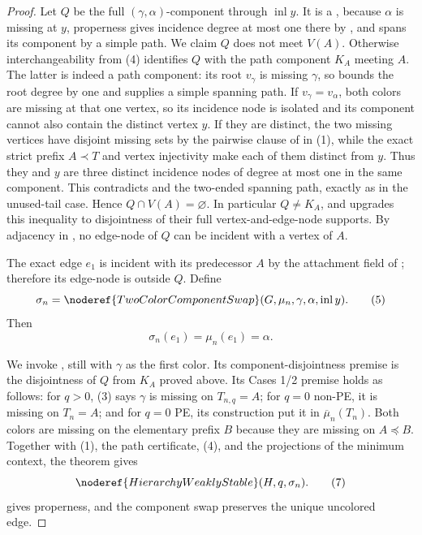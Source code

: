 \begin{proof}
Let \(Q\) be the full \((\gamma,\alpha)\)-component through
\(\operatorname{inl}y\).  It is a
, because \(\alpha\) is missing at \(y\),
properness gives incidence degree at most one there by
, and
 spans its component by a simple
path.  We claim \(Q\) does not meet \(V(A)\).  Otherwise interchangeability
from (4) identifies \(Q\) with the path component \(K_A\) meeting \(A\).
The latter is indeed a path component: its root \(v_\gamma\) is missing
\(\gamma\), so  bounds the root
degree by one and  supplies a
simple spanning path.
If \(v_\gamma=v_\alpha\), both colors are missing at that one vertex, so
its incidence node is isolated and its component cannot also contain the
distinct vertex \(y\).  If they are distinct, the two missing vertices
have disjoint missing sets by the pairwise clause of
 in (1), while the exact strict prefix
\(A\prec T\) and vertex injectivity make each of them distinct from
\(y\).  Thus they and \(y\) are three distinct incidence nodes of degree
at most one in the same component.  This contradicts
 and the two-ended spanning
path, exactly as in the unused-tail case.  Hence \(Q\cap V(A)=\varnothing\).
In particular \(Q\ne K_A\), and
 upgrades this inequality to
disjointness of their full vertex-and-edge-node supports.
By adjacency in , no edge-node of \(Q\)
can be incident with a vertex of \(A\).

The exact edge \(e_1\) is incident with its predecessor \(A\) by the
attachment field of ; therefore its edge-node is
outside \(Q\).  Define
\[
 \sigma_n=\noderef{TwoColorComponentSwap}
       (G,\mu_n,\gamma,\alpha,\operatorname{inl}y).           \tag{5}
\]
Then
\[
                 \sigma_n(e_1)=\mu_n(e_1)=\alpha.            \tag{6}
\]

We invoke , still with \(\gamma\) as the
first color.  Its component-disjointness premise is the disjointness of
\(Q\) from \(K_A\) proved above.  Its Cases 1/2 premise holds as follows:
for \(q>0\), (3) says \(\gamma\) is missing on \(T_{n,q}=A\); for \(q=0\)
non-PE, it is missing on \(T_n=A\); and for \(q=0\) PE, its construction
put it in \(\overline\mu_n(T_n)\).  Both colors are missing on the
elementary prefix \(B\) because they are missing on \(A\preccurlyeq B\).
Together with (1), the path certificate, (4), and the projections of the
minimum context, the theorem gives
\[
              \noderef{HierarchyWeaklyStable}(H,q,\sigma_n). \tag{7}
\]
 gives properness, and the component
swap preserves the unique uncolored edge.


\end{proof}

